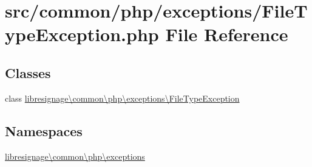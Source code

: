 \hypertarget{FileTypeException_8php}{}\section{src/common/php/exceptions/\+File\+Type\+Exception.php File Reference}
\label{FileTypeException_8php}
\subsection*{Classes}
\begin{DoxyCompactItemize}
\item 
class \hyperlink{classlibresignage_1_1common_1_1php_1_1exceptions_1_1FileTypeException}{libresignage\textbackslash{}common\textbackslash{}php\textbackslash{}exceptions\textbackslash{}\+File\+Type\+Exception}
\end{DoxyCompactItemize}
\subsection*{Namespaces}
\begin{DoxyCompactItemize}
\item 
 \hyperlink{namespacelibresignage_1_1common_1_1php_1_1exceptions}{libresignage\textbackslash{}common\textbackslash{}php\textbackslash{}exceptions}
\end{DoxyCompactItemize}
